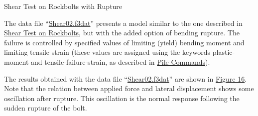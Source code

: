 \documentclass[a4paper, nobind]{templates/ociamthesis}
\begin{document}
Shear Test on Rockbolts
with Rupture

The data file ``\protect\hyperlink{pulltestshear02data}{Shear02.f3dat}'' presents a model
similar to the one described in \protect\hyperlink{pulltest-shear-bolt-section}{Shear Test on
Rockbolts},
but with the added option of bending rupture. The failure is controlled
by
specified values of limiting (yield) bending moment and limiting tensile
strain
(these values are assigned using the keywords plastic-moment and
tensile-failure-strain, as described in \href{../../../../sel/doc/manual/sel_manual/piles/commands/pile_commands.html\#sel-pile-commands}{Pile
Commands}).

The results obtained with the data file
``\protect\hyperlink{pulltestshear02data}{Shear02.f3dat}'' are shown in \protect\hyperlink{pulltest-shear2}{Figure
16}. Note that the relation between applied
force and lateral displacement shows some oscillation after rupture.
This
oscillation is the normal response following the sudden rupture of the
bolt.
\end{document}
